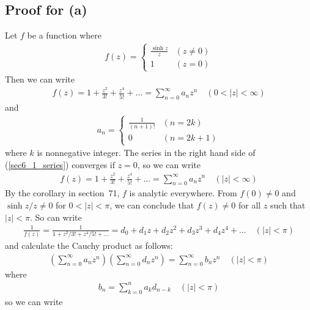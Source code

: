 \documentclass{scrartcl}
\begin{document}
\subsection{Proof for (a)}
Let \(f\) be a function where
\begin{align*}
  f(z) = \begin{cases}
    \frac{\sinh z}{z} & (z \not = 0) \\
    1 & (z = 0)
  \end{cases}
\end{align*}
Then we can write
\begin{align}\label{sec6_1_series}
  f(z) = 1 + \frac{z^2}{3!} + \frac{z^4}{5!} + \dots = \sum^\infty_{n = 0} a_n z^n \quad (0 < |z| < \infty)
\end{align}
and
\begin{align*}
  a_n = \begin{cases}
    \frac{1}{(n + 1)!} & (n = 2k) \\
    0 & (n = 2k + 1)
  \end{cases}
\end{align*}
where \(k\) is nonnegative integer.
The series in the right hand side of (\ref{sec6_1_series}) converges if \(z = 0\), so we can write
\begin{align*}
  f(z) = 1 + \frac{z^2}{3!} + \frac{z^4}{5!} + \dots = \sum^\infty_{n = 0} a_n z^n \quad (|z| < \infty)
\end{align*}
By the corollary in section~71, \(f\) is analytic everywhere.
From \(f(0) \not = 0\) and \(\sinh z / z \not = 0\) for \(0 < |z| < \pi\), we can conclude that \(f(z) \not = 0\) for all \(z\) such that \(|z| < \pi\).
So can write
\begin{align*}
  \frac{1}{f(z)} = \frac{1}{1 + z^2 / 3! + z^4 / 5! + \dots} = d_0 + d_1 z + d_2 z^2 + d_3 z^3 + d_4 z^4 + \dots \quad (|z| < \pi)
\end{align*}
and calculate the Cauchy product as follows:
\begin{align*}
  \left( \sum^\infty_{n = 0} a_n z^n \right) \left( \sum^\infty_{n = 0} d_n z^n \right)
  = \sum^\infty_{n = 0} b_n z^n \quad (|z| < \pi)
\end{align*}
where
\begin{align*}
  b_n = \sum^n_{k = 0} a_k d_{n - k} \quad (|z| < \pi)
\end{align*}
so we can write
\end{document}
